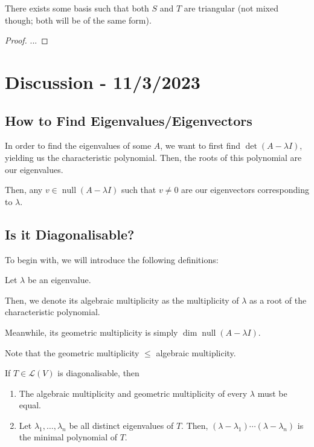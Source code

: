 \documentclass[openany]{book}
\DeclareMathOperator*{\vnull}{null}
\begin{document}
\begin{defn}
	There exists some basis such that both $S$ and $T$ are triangular (not mixed though; both will be of the same form).
\end{defn}
\begin{proof}
	...
\end{proof}

\section{Discussion - 11/3/2023}
\subsection{How to Find Eigenvalues/Eigenvectors}
In order to find the eigenvalues of some $A$, we want to first find $\det(A - \lambda I)$, yielding us the characteristic polynomial. Then, the roots of this polynomial are our eigenvalues.

Then, any $v \in \vnull (A - \lambda I)$ such that $v \neq 0$ are our eigenvectors corresponding to $\lambda$.

\subsection{Is it Diagonalisable?}
To begin with, we will introduce the following definitions:
\begin{defn}
	Let $\lambda$ be an eigenvalue. 
	
	Then, we denote its algebraic multiplicity as the multiplicity of $\lambda$ as a root of the characteristic polynomial.
	
	Meanwhile, its geometric multiplicity is simply $\dim\vnull (A - \lambda I)$.
	
	Note that the geometric multiplicity $\leq$ algebraic multiplicity.
\end{defn}

If $T \in \mathcal L(V)$ is diagonalisable, then
\begin{enumerate}
	\item The algebraic multiplicity and geometric multiplicity of every $\lambda$ must be equal.
	\item Let $\lambda_1, \ldots, \lambda_n$ be all distinct eigenvalues of $T$. Then, $(\lambda - \lambda_1) \cdots (\lambda - \lambda_n)$ is the minimal polynomial of $T$.
\end{enumerate}
\end{document}
